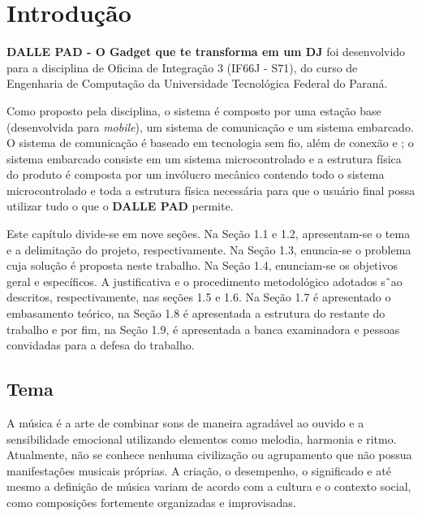 
\chapter{Introdução}
\label{chap:introducao}

    \textbf{DALLE PAD - O Gadget que te transforma em um DJ} foi desenvolvido para a disciplina de Oficina de Integração 3 (IF66J - S71), do curso de Engenharia de Computação da Universidade Tecnológica Federal do Paraná.

    Como proposto pela disciplina, o sistema é composto por uma estação base (desenvolvida para \textit{mobile}), um sistema de comunicação e um sistema embarcado. O sistema de comunicação é baseado em tecnologia sem fio, além de conexão  e ; o sistema embarcado consiste em um sistema microcontrolado e a estrutura física do produto é composta por um invólucro mecânico contendo todo o sistema microcontrolado e toda a estrutura física necessária para que o usuário final possa utilizar tudo o que o \textbf{DALLE PAD} permite.

    Este capítulo divide-se em nove seções. Na Seção 1.1 e 1.2, apresentam-se o tema e a delimitação do projeto, respectivamente. Na Seção 1.3, enuncia-se o problema cuja solução é proposta neste trabalho. Na Seção 1.4, enunciam-se os objetivos geral e específicos. A justificativa e o procedimento metodológico adotados s˜ao descritos, respectivamente, nas seções 1.5 e 1.6. Na Seção 1.7 é apresentado o embasamento teórico, na Seção 1.8 é apresentada a estrutura do restante do trabalho e por fim, na Seção 1.9, é apresentada a banca examinadora e pessoas convidadas para a defesa do trabalho.

    \section{Tema}

        A música é a arte de combinar sons de maneira agradável ao ouvido e a sensibilidade emocional utilizando elementos como melodia, harmonia e ritmo. Atualmente, não se conhece nenhuma civilização ou agrupamento que não possua manifestações musicais próprias. A criação, o desempenho, o significado e até mesmo a definição de música variam de acordo com a cultura e o contexto social, como composições fortemente organizadas e improvisadas.

